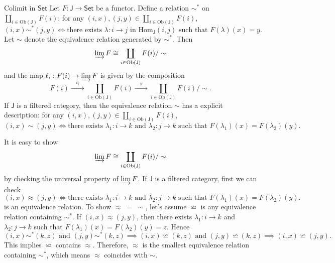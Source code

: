 \begin{example}{Colimit in $\mathsf{Set}$}{}
    Let $F:\mathsf{J}\to \mathsf{Set}$ be a functor. Define a relation $\sim^*$ on $\coprod\limits_{i\in \mathrm{Ob}(\mathsf{J})}F(i)$: for any $(i,x),(j,y)\in \coprod\limits_{i\in \mathrm{Ob}(\mathsf{J})}F(i)$,
    \[
        (i,x)\sim^* (j,y)\iff \text{there exists }\lambda:i\to j\text{ in }\mathrm{Hom}_\mathsf{J}(i,j)\text{ such that }F(\lambda)(x)=y.
    \]
    Let $\sim$ denote the equivalence relation generated by $\sim^*$. Then 
    \[
        \varinjlim F\cong\coprod_{i\in \mathrm{Ob}(\mathsf{J})}F(i)/\sim
    \]
    and the map $\ell_i:F(i)\to \varinjlim F$ is given by the composition
    \[
        F(i)\xrightarrow{\quad\iota_i\quad}\coprod_{i\in \mathrm{Ob}(\mathsf{J})}F(i)\xrightarrow{\quad\pi\quad}\coprod_{i\in \mathrm{Ob}(\mathsf{J})}F(i)/\sim.
    \]
    If $\mathsf{J}$ is a filtered category, then the equivalence relation $\sim$ has a explicit description: for any $(i,x),(j,y)\in \coprod\limits_{i\in \mathrm{Ob}(\mathsf{J})}F(i)$,
    \[
        (i,x)\sim (j,y)\iff \text{there exists }\lambda_1:i\to k\text{ and }\lambda_2:j\to k\text{ such that }F(\lambda_1)(x)=F(\lambda_2)(y).
    \]
\end{example}

\begin{prf} 
    It is easy to show 
    \[
        \varinjlim F\cong\coprod_{i\in \mathrm{Ob}(\mathsf{J})}F(i)/\sim
    \]
    by checking the universal property of $\varinjlim F$. If $\mathsf{J}$ is a filtered category, first we can check 
    \[
        (i,x)\approx (j,y)\iff \text{there exists }\lambda_1:i\to k\text{ and }\lambda_2:j\to k\text{ such that }F(\lambda_1)(x)=F(\lambda_2)(y).
    \]
    is an equivalence relation. To show $\approx\;=\;\sim$, let's assume $\backsimeq$ is any equivalence relation containing $\sim^*$. If $(i,x)\approx(j,y)$, then there exists $\lambda_1:i\to k$ and $\lambda_2:j\to k$ such that $F(\lambda_1)(x)=F(\lambda_2)(y)=z$. Hence 
    \[
        (i,x)\sim^* (k,z)\text{ and }(j,y)\sim^* (k,z)\implies(i,x)\backsimeq (k,z)\text{ and }(j,y)\backsimeq (k,z)\implies (i,x)\backsimeq (j,y).
    \]
    This implies $\backsimeq$ contains $\approx$. Therefore, $\approx$ is the smallest equivalence relation containing $\sim^*$, which means $\approx$ coincides with $\sim$.
\end{prf}





